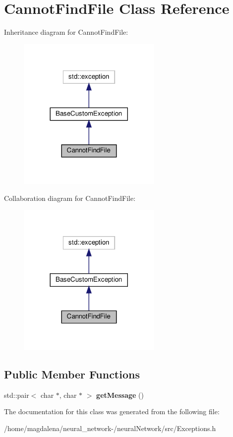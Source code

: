 \hypertarget{classCannotFindFile}{}\section{Cannot\+Find\+File Class Reference}
\label{classCannotFindFile}


Inheritance diagram for Cannot\+Find\+File\+:
\nopagebreak
\begin{figure}[H]
\begin{center}
\leavevmode
\includegraphics[width=197pt]{classCannotFindFile__inherit__graph}
\end{center}
\end{figure}


Collaboration diagram for Cannot\+Find\+File\+:
\nopagebreak
\begin{figure}[H]
\begin{center}
\leavevmode
\includegraphics[width=197pt]{classCannotFindFile__coll__graph}
\end{center}
\end{figure}
\subsection*{Public Member Functions}
\begin{DoxyCompactItemize}
\item 
\mbox{\label{classCannotFindFile_a1431a15fe56ddc4e7de6e2160c1f4447}} 
std\+::pair$<$ char $\ast$, char $\ast$ $>$ {\bfseries get\+Message} ()
\end{DoxyCompactItemize}


The documentation for this class was generated from the following file\+:\begin{DoxyCompactItemize}
\item 
/home/magdalena/neural\+\_\+network-\//neural\+Network/src/Exceptions.\+h\end{DoxyCompactItemize}
